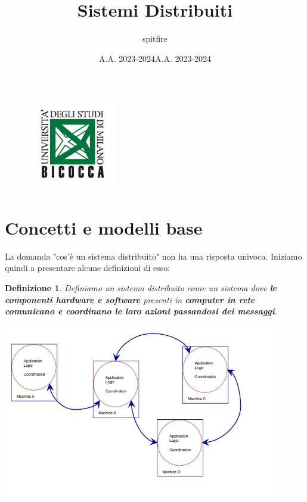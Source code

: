 \documentclass[12pt]{article}
\title{Sistemi Distribuiti}
\author{spitfire}
\date{A.A. 2023-2024}
\newtheorem{Definizione}{Definizione}[subsection]
\begin{document}
\begin{figure}
    \centering
    \includegraphics[width=0.35\textwidth]{Images/Logo scienze bicocca.png}
\end{figure}

\vspace{10cm}
\date{A.A. 2023-2024}


\maketitle

\newpage

\tableofcontents
\newpage

\section{Concetti e modelli base}
La domanda "cos'è un sistema distribuito" non ha una risposta univoca. Iniziamo quindi a presentare alcune definizioni di esso:
\begin{Definizione}
    Definiamo un sistema distribuito come un sistema dove \textbf{le componenti hardware e software} presenti in \textbf{computer in rete comunicano e coordinano le loro azioni passandosi dei messaggi}.
    \begin{center}
        \includegraphics[width = 0.90\textwidth]{Images/1.PNG}
    \end{center}
\end{Definizione}
\end{document}
